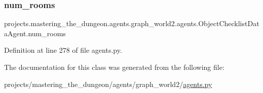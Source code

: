 \subsubsection{\texorpdfstring{num\+\_\+rooms}{num\_rooms}}
{\footnotesize\ttfamily projects.\+mastering\+\_\+the\+\_\+dungeon.\+agents.\+graph\+\_\+world2.\+agents.\+Object\+Checklist\+Data\+Agent.\+num\+\_\+rooms}



Definition at line 278 of file agents.\+py.



The documentation for this class was generated from the following file\+:\begin{DoxyCompactItemize}
\item 
projects/mastering\+\_\+the\+\_\+dungeon/agents/graph\+\_\+world2/\hyperlink{projects_2mastering__the__dungeon_2agents_2graph__world2_2agents_8py}{agents.\+py}\end{DoxyCompactItemize}
